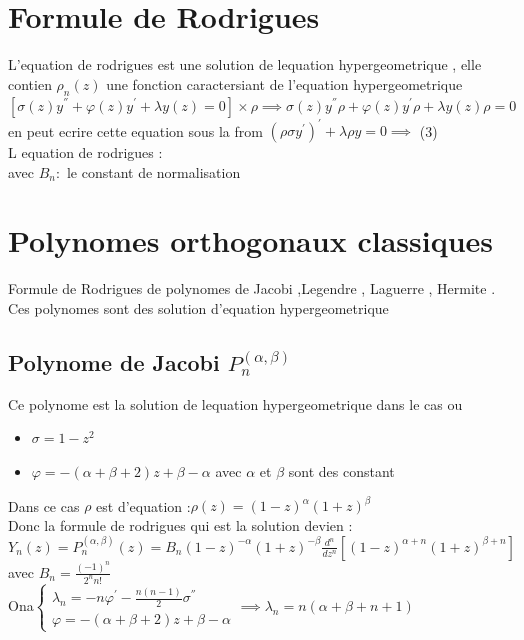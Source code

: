 \documentclass[12pt]{book}
\begin{document}
        \section{Formule de Rodrigues}
            L'equation de rodrigues est une solution de lequation hypergeometrique , elle contien  $ \rho_n(z) $ une fonction caractersiant de l'equation hypergeometrique\\
            $ \left[\sigma(z)y^{''} + \varphi(z)y^{'} + \lambda y(z) = 0\right]\times \rho \implies \sigma(z)y^{''}\rho + \varphi(z)y^{'}\rho + \lambda y(z)\rho = 0$ en peut ecrire cette equation sous la from 
            $(\rho\sigma y^{'})^{'} + \lambda\rho y =0 \implies$  (3) \\
            L equation de rodrigues :  \\
            avec $B_n :$ le constant de normalisation
        \section{Polynomes orthogonaux classiques}
            Formule de Rodrigues de polynomes de Jacobi ,Legendre , Laguerre , Hermite . \\
            Ces polynomes sont  des solution d'equation hypergeometrique 
            \subsection*{Polynome de Jacobi $ P_n^{(\alpha , \beta)} $}
                Ce polynome est la solution de lequation hypergeometrique dans le cas ou 
                \begin{itemize}
                    \item $\sigma = 1-z^2$
                    \item $\varphi = -(\alpha + \beta +2)z +\beta-\alpha$ avec $\alpha$ et $ \beta  $ sont des constant
                \end{itemize} 
                Dans ce cas $\rho$ est d'equation :$ \rho(z) = (1-z)^{\alpha}(1+z)^{\beta} $ \\
                Donc la formule de rodrigues qui est la solution devien : \\
                $ Y_n(z) = P_n^{(\alpha ,\beta)}(z) = B_n(1-z)^{-\alpha}(1+z)^{-\beta}\frac{d^n}{dz^n}\left[ (1-z)^{\alpha + n}(1+z)^{\beta + n} \right] $ \\
                avec $B_n = \frac{(-1)^n}{2^nn!}$\\
                Ona$ \begin{cases}
                    \lambda_n = -n\varphi^{'} - \frac{n(n-1)}{2}\sigma^{''} \\
                    \varphi = -(\alpha + \beta +2)z +\beta-\alpha
                \end{cases} \implies \lambda_n = n(\alpha + \beta + n + 1)$ 
\end{document}

